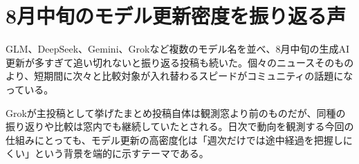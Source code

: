 \section{8月中旬のモデル更新密度を振り返る声}

GLM、DeepSeek、Gemini、Grokなど複数のモデル名を並べ、8月中旬の生成AI更新が多すぎて追い切れないと振り返る投稿も続いた。個々のニュースそのものより、短期間に次々と比較対象が入れ替わるスピードがコミュニティの話題になっている。

Grokが主投稿として挙げたまとめ投稿自体は観測窓より前のものだが、同種の振り返りや比較は窓内でも継続していたとされる。日次で動向を観測する今回の仕組みにとっても、モデル更新の高密度化は「週次だけでは途中経過を把握しにくい」という背景を端的に示すテーマである。
